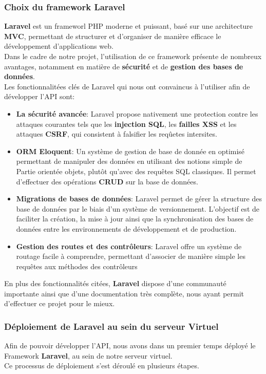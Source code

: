 \documentclass[10pt, a4paper]{report}
\begin{document}
	\subsubsection{Choix du framework Laravel}
	\textbf{Laravel} est un frameworl PHP moderne et puissant, basé sur une architecture \textbf{MVC}, permettant de structurer et d'organiser de manière efficace le développement d'applications web.\\
	Dans le cadre de notre projet, l'utilisation de ce framework présente de nombreux avantages, notamment en matière de \textbf{sécurité} et de \textbf{gestion des bases de données}.\\
	Les fonctionnalitées clés de Laravel qui nous ont convaincus à l'utiliser afin de développer l'API sont:
	\begin{itemize}
		\item \textbf{La sécurité avancée}: Laravel propose nativement une protection contre les attaques courantes tels que les \textbf{injection SQL}, les \textbf{failles XSS} et les attaques \textbf{CSRF}, qui consistent à falsifier les reqûetes intersites.
		
		\item \textbf{ORM Eloquent}: Un système de gestion de base de donnée en optimisé permettant de manipuler des données en utilisant des notions simple de Partie orientée objets, plutôt qu'avec des requêtes SQL classiques. Il permet d'effectuer des opérations \textbf{CRUD} sur la base de données.
		
		\item \textbf{Migrations de bases de données}: Laravel permet de gérer la structure des base de données par le biais d'un système de versionnement. L'objectif est de faciliter la création, la mise à jour ainsi que la synchronisation des bases de données entre les environnements de développement et de production.
		
		\item \textbf{Gestion des routes et des contrôleurs}: Laravel offre un système de routage facile à comprendre, permettant d'associer de manière simple les requêtes aux méthodes des contrôleurs
	\end{itemize}
	En plus des fonctionnalités citées, \textbf{Laravel} dispose d'une communauté importante ainsi que d'une documentation très complète, nous ayant permit d'effectuer ce projet pour le mieux.
	
	\subsubsection{Déploiement de Laravel au sein du serveur Virtuel}
	Afin de pouvoir développer l'API, nous avons dans un premier temps déployé le Framework \textbf{Laravel}, au sein de notre serveur virtuel.\\
	Ce processus de déploiement s'est déroulé en plusieurs étapes.
\end{document}
